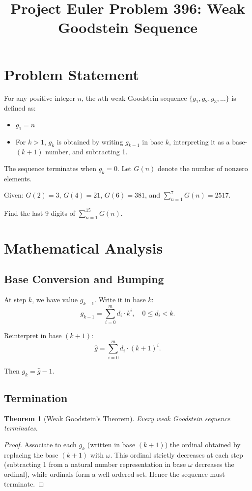 \documentclass[12pt]{article}
\title{Project Euler Problem 396: Weak Goodstein Sequence}
\author{}
\date{}
\newtheorem{theorem}{Theorem}
\theoremstyle{definition}
\begin{document}
\maketitle

\section{Problem Statement}

For any positive integer $n$, the $n$th weak Goodstein sequence $\{g_1, g_2, g_3, \ldots\}$ is defined as:
\begin{itemize}
    \item $g_1 = n$
    \item For $k > 1$, $g_k$ is obtained by writing $g_{k-1}$ in base $k$, interpreting it as a base-$(k+1)$ number, and subtracting 1.
\end{itemize}

The sequence terminates when $g_k = 0$. Let $G(n)$ denote the number of nonzero elements.

Given: $G(2) = 3$, $G(4) = 21$, $G(6) = 381$, and $\sum_{n=1}^{7} G(n) = 2517$.

Find the last 9 digits of $\sum_{n=1}^{15} G(n)$.

\section{Mathematical Analysis}

\subsection{Base Conversion and Bumping}

At step $k$, we have value $g_{k-1}$. Write it in base $k$:
\[
g_{k-1} = \sum_{i=0}^{m} d_i \cdot k^i, \quad 0 \le d_i < k.
\]

Reinterpret in base $(k+1)$:
\[
\hat{g} = \sum_{i=0}^{m} d_i \cdot (k+1)^i.
\]

Then $g_k = \hat{g} - 1$.

\subsection{Termination}

\begin{theorem}[Weak Goodstein's Theorem]
Every weak Goodstein sequence terminates.
\end{theorem}

\begin{proof}
Associate to each $g_k$ (written in base $(k+1)$) the ordinal obtained by replacing the base $(k+1)$ with $\omega$. This ordinal strictly decreases at each step (subtracting 1 from a natural number representation in base $\omega$ decreases the ordinal), while ordinals form a well-ordered set. Hence the sequence must terminate.
\end{proof}
\end{document}
